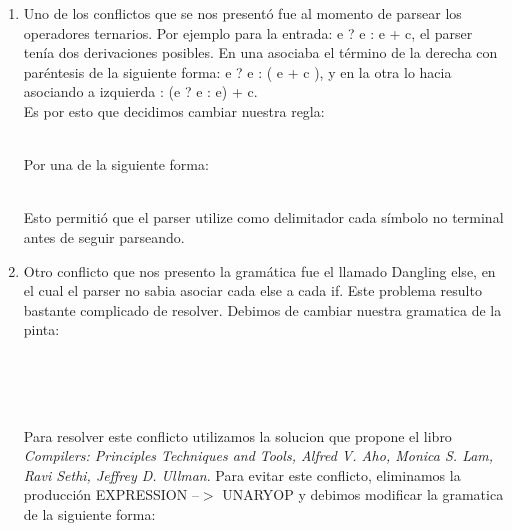 \begin{enumerate}
    
\item Uno de los conflictos que se nos presentó fue al momento de parsear los
operadores ternarios. Por ejemplo para la entrada: e ? e : e + c, el parser
tenía dos derivaciones posibles. En una asociaba el término de la derecha con
paréntesis de la siguiente forma: e ? e : ( e + c ), y en la otra lo hacia
asociando a izquierda : (e ? e : e) + c. \\
Es por esto que decidimos cambiar nuestra regla: 
\\
\begin{reglas}
\end{reglas}
\\
Por una de la siguiente forma:
\\
\begin{reglas}
\end{reglas}
\\
Esto permitió que el parser utilize como delimitador cada símbolo no terminal
antes de seguir parseando.

\item Otro conflicto que nos presento la gramática fue el llamado Dangling
  else, en el cual el parser no sabia asociar cada else a cada if. Este
  problema resulto bastante complicado de resolver. Debimos de cambiar nuestra
  gramatica de la pinta:
  \begin{reglas}
    \\
    \\
    \\
    \aregla{\LAMBDA}
  \end{reglas}
  Para resolver este conflicto utilizamos la solucion que propone el libro
  \textit{Compilers: Principles Techniques and Tools, Alfred V. Aho, Monica S.
  Lam, Ravi Sethi, Jeffrey D. Ullman}. Para evitar este conflicto, eliminamos la producción
  EXPRESSION --$>$ UNARYOP y debimos modificar la gramatica de la siguiente forma:

\begin{reglas}
    \\
    \\
    \\
 

\end{reglas}
\end{enumerate}
